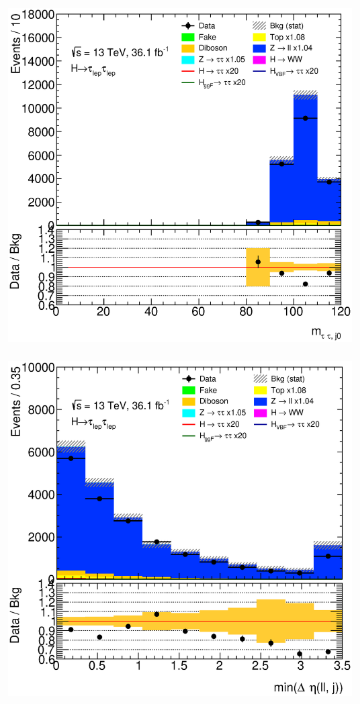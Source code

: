 \begin{figure}[htb]
\begin{subfigure}[t]{0.3\textwidth}
    \end{subfigure}
    \begin{subfigure}[t]{0.3\textwidth}
        \includegraphics[width=\textwidth]{./plots/mva/modeling/input_vars/BOOST_CR/ll-CutMVABoostedCatZllCR-MassTauTauJ0-lin.eps}
    \end{subfigure}
    \begin{subfigure}[t]{0.3\textwidth}
        \includegraphics[width=\textwidth]{./plots/mva/modeling/input_vars/BOOST_CR/ll-CutMVABoostedCatZllCR-MinDEtaDilepJets-lin.eps}

\end{subfigure}
\end{figure}
